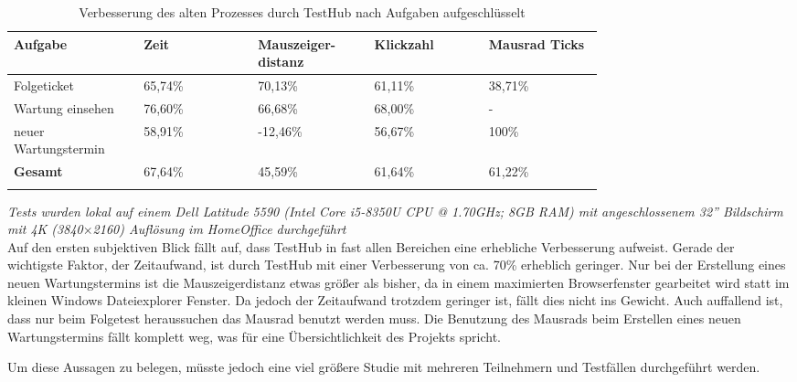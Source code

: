 \begin{longtable}{| P{0.15\linewidth} | P{0.15\linewidth} | P{0.15\linewidth} | P{0.15\linewidth} | P{0.15\linewidth} |} 
  \hline
  \textbf{Aufgabe} & \textbf{Zeit} & \textbf{Mauszeiger- distanz} & \textbf{Klickzahl} & \textbf{Mausrad Ticks}\\[0.5ex] 
  \hline
  
  Folgeticket & 65,74\% & 70,13\% & 61,11\% & 38,71\% \\ [0.5ex] \hline
  Wartung einsehen & 76,60\% & 66,68\% & 68,00\% & - \\ [0.5ex] \hline
  neuer Wartungstermin & 58,91\% & -12,46\% & 56,67\% & 100\% \\ [0.5ex] \hline
  \textbf{Gesamt} & 67,64\% & 45,59\% & 61,64\% & 61,22\% \\ [0.5ex] \hline
  \caption{Verbesserung des alten Prozesses durch TestHub nach Aufgaben aufgeschlüsselt }\label{tab:valres}
\end{longtable}

\textit{Tests wurden lokal auf einem Dell Latitude 5590 (Intel Core i5-8350U CPU
@ 1.70GHz; 8GB RAM) mit angeschlossenem 32'' Bildschirm mit 4K (3840$\times$2160) Auflösung im HomeOffice durchgeführt} \\[2ex]



Auf den ersten subjektiven Blick fällt auf, dass TestHub in fast allen Bereichen eine erhebliche
Verbesserung aufweist. Gerade der wichtigste Faktor, der Zeitaufwand, ist durch TestHub 
mit einer Verbesserung von ca. 70\% erheblich geringer. Nur bei der Erstellung eines neuen Wartungstermins
ist die Mauszeigerdistanz etwas größer als bisher, da in einem maximierten Browserfenster
gearbeitet wird statt im kleinen Windows Dateiexplorer Fenster. Da jedoch der 
Zeitaufwand trotzdem geringer ist, fällt dies nicht ins Gewicht.
Auch auffallend ist,
dass nur beim Folgetest heraussuchen das Mausrad benutzt werden muss. Die Benutzung des 
Mausrads beim Erstellen eines neuen Wartungstermins fällt komplett weg, was für 
eine Übersichtlichkeit des Projekts spricht.

Um diese Aussagen zu belegen, müsste jedoch eine viel größere Studie mit mehreren 
Teilnehmern und Testfällen durchgeführt werden.

\newpage


